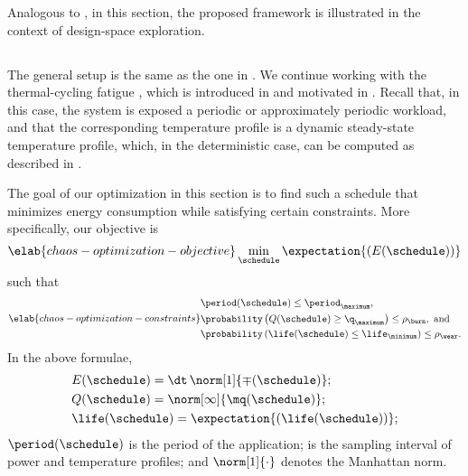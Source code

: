 Analogous to , in this section, the proposed framework
is illustrated in the context of design-space exploration.

\subsection{\problemtitle}

The general setup is the same as the one in .
We continue working with the thermal-cycling fatigue \cite{jedec2016}, which is
introduced in  and motivated in
. Recall that, in this case, the system is exposed a
periodic or approximately periodic workload, and that the corresponding
temperature profile is a dynamic steady-state temperature profile, which, in the
deterministic case, can be computed as described in
.

The goal of our optimization in this section is to find such a schedule
\schedule that minimizes energy consumption while satisfying certain
constraints. More specifically, our objective is
\begin{equation} \elab{chaos-optimization-objective}
  \min_{\schedule} \expectation{(E(\schedule))}
\end{equation}
such that
\begin{equation} \elab{chaos-optimization-constraints}
  \begin{split}
    & \period(\schedule) \leq \period_\maximum, \\
    & \probability\left(Q(\schedule) \geq \q_\maximum\right) \leq \rho_\burn, \text{ and} \\
    & \probability\left(\life(\schedule) \leq \life_\minimum\right) \leq \rho_\wear.
  \end{split}
\end{equation}
In the above formulae,
\begin{align*}
  & E(\schedule) = \dt \, \norm[1]{\mp(\schedule)}; \\
  & Q(\schedule) = \norm[\infty]{\mq(\schedule)}; \\
  & \life(\schedule) = \expectation{\left(\life(\schedule)\right)};
\end{align*}
$\period(\schedule)$ is the period of the application; \dt is the sampling
interval of power and temperature profiles; and $\norm[1]{\cdot}$ denotes the
Manhattan norm.

